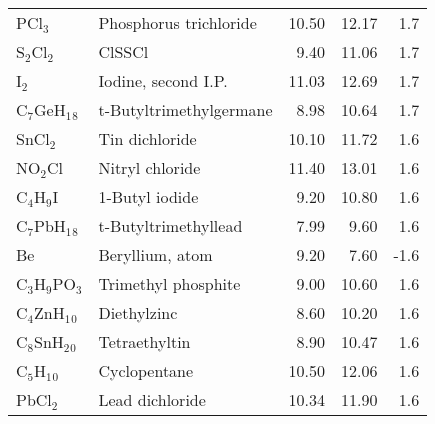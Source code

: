 \begin{table}
\begin{center}
\begin{tabular}{llrrr}
 PCl$_3$              & Phosphorus trichloride                 &   10.50   &    12.17   &    1.7\\
 S$_2$Cl$_2$          & ClSSCl                                 &    9.40   &    11.06   &    1.7\\
 I$_2$                & Iodine, second I.P.                    &   11.03   &    12.69   &    1.7\\
 C$_7$GeH$_1$$_8$     & t-Butyltrimethylgermane                &    8.98   &    10.64   &    1.7\\
 SnCl$_2$             & Tin dichloride                         &   10.10   &    11.72   &    1.6\\
 NO$_2$Cl             & Nitryl chloride                        &   11.40   &    13.01   &    1.6\\
 C$_4$H$_9$I          & 1-Butyl iodide                         &    9.20   &    10.80   &    1.6\\
 C$_7$PbH$_1$$_8$     & t-Butyltrimethyllead                   &    7.99   &     9.60   &    1.6\\
 Be                   & Beryllium, atom                        &    9.20   &     7.60   &   -1.6\\
 C$_3$H$_9$PO$_3$     & Trimethyl phosphite                    &    9.00   &    10.60   &    1.6\\
 C$_4$ZnH$_1$$_0$     & Diethylzinc                            &    8.60   &    10.20   &    1.6\\
 C$_8$SnH$_2$$_0$     & Tetraethyltin                          &    8.90   &    10.47   &    1.6\\
 C$_5$H$_1$$_0$       & Cyclopentane                           &   10.50   &    12.06   &    1.6\\
 PbCl$_2$             & Lead dichloride                        &   10.34   &    11.90   &    1.6\\
\hline
\end{tabular}
\end{center}
\end{table}
